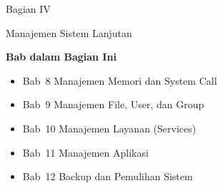\documentclass[
    paper=23cm:15.5cm,   %
    11pt,               %
    twoside,            %
    openany,            %
    bibliography=totoc, %
]{scrbook}            %
\begin{document}
\newpage
{}
\vspace*{4cm}
{\fontsize{28}{34}\sffamily\bfseries\raggedright Bagian IV\par}
\vspace{6pt}
{\fontsize{22}{28}\sffamily\bfseries\raggedright Manajemen Sistem Lanjutan\par}
\vspace{16pt}
{\large\sffamily\bfseries Bab dalam Bagian Ini}\par
\vspace{6pt}
\begin{itemize}[topsep=0pt, itemsep=2pt]
  \item Bab~8 \textbullet{} Manajemen Memori dan System Call
  \item Bab~9 \textbullet{} Manajemen File, User, dan Group
  \item Bab~10 \textbullet{} Manajemen Layanan (Services)
  \item Bab~11 \textbullet{} Manajemen Aplikasi
  \item Bab~12 \textbullet{} Backup dan Pemulihan Sistem
\end{itemize}
\newpage











\appendix



% 



\backmatter

\printbibliography[heading=bibintoc, title={Daftar Pustaka}]

\printindex




\end{document}
